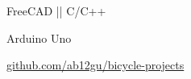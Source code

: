 \begin{subtitle}
    \vspace{-5ex}
    {{}} 
\end{subtitle}

\vspace{-1.5ex}
{
    \vspace{-0.8ex}
    \color{cyan}\small
    {FreeCAD || C/C++} %
}

{
    \vspace{-2.5ex}\hspace{1.5in}
    \color{cyan}\small
    {Arduino Uno} %
}

{
    \vspace{-2.5ex}\hspace{3in}
    \color{blue}\small
    {\href{https://github.com/ab12gu/bicycle-projects}{github.com/ab12gu/bicycle-projects}{}}
}

\vspace{0.5ex}








\vspace{-3.5ex}
